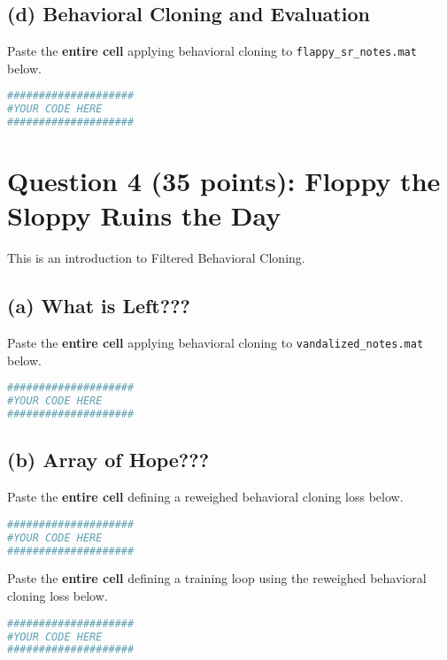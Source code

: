 \documentclass{article}
\begin{document}
        \subsection*{(d) Behavioral Cloning and Evaluation} 
            Paste the \textbf{entire cell} applying behavioral cloning to \verb+flappy_sr_notes.mat+ below.
            \begin{solution}
                \begin{lstlisting}[language=Python]
####################
#YOUR CODE HERE
####################
                \end{lstlisting}
            \end{solution}

    \section*{Question 4 (35 points): Floppy the Sloppy Ruins the Day }
    This is an introduction to Filtered Behavioral Cloning.
    
        \subsection*{(a) What is Left???} 
            Paste the \textbf{entire cell} applying behavioral cloning to \verb+vandalized_notes.mat+ below.
            \begin{solution}
                \begin{lstlisting}[language=Python]
####################
#YOUR CODE HERE
####################
                \end{lstlisting}
            \end{solution}

        
        \subsection*{(b) Array of Hope???} 
            Paste the \textbf{entire cell} defining a reweighed behavioral cloning loss below.
            \begin{solution}
                \begin{lstlisting}[language=Python]
####################
#YOUR CODE HERE
####################
                \end{lstlisting}
            \end{solution}

            \noindent
            Paste the \textbf{entire cell} defining a training loop using the reweighed behavioral cloning loss below.
            \begin{solution}
                \begin{lstlisting}[language=Python]
####################
#YOUR CODE HERE
####################
                \end{lstlisting}
            \end{solution}
\end{document}
